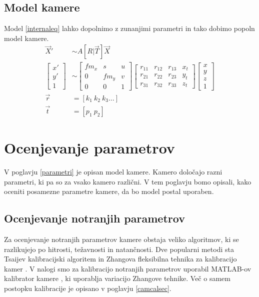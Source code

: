 \documentclass[a4paper, 12pt]{book}
\begin{document}
\subsection{Model kamere}

Model \eqref{internaleq} lahko dopolnimo z zunanjimi parametri in tako dobimo popoln model kamere.
\begin{align}
\label{totalmodel}
\vec{X}' &\sim A[R | \vec{T}] \vec{X} \\
\begin{bmatrix}
x' \\
y' \\
1
\end{bmatrix}
&\sim
\begin{bmatrix}
fm_x & s & u \\
0 & fm_y & v \\
0 & 0 & 1
\end{bmatrix}
\begin{bmatrix}
r_{11} & r_{12} & r_{13} & x_t\\
r_{21} & r_{22} & r_{23} & y_t\\
r_{31} & r_{32} & r_{33} & z_t
\end{bmatrix}
\begin{bmatrix}
x \\
y \\
z \\
1
\end{bmatrix} \\
\vec{r} &= [k_1 \ k_2 \ k_3 \dots] \\
\vec{t} &= [p_1 \ p_2]
\end{align}

\section{Ocenjevanje parametrov}
V poglavju \ref{parametri} je opisan model kamere. Kamero določajo razni parametri, ki pa so za vsako kamero različni. V tem poglavju bomo opisali, kako oceniti posamezne parametre kamere, da bo model postal uporaben.

\subsection{Ocenjevanje notranjih parametrov}
Za ocenjevanje notranjih parametrov kamere obstaja veliko algoritmov, ki se razlikujejo po hitrosti, težavnosti in natančnosti. Dve popularni metodi sta Tsaijev kalibracijski algoritem \cite{horn2000tsai} in Zhangova fleksibilna tehnika za kalibracijo kamer \cite{zhang2000flexible}. V nalogi smo za kalibracijo notranjih parametrov uporabil MATLAB-ov kalibrator kamere \cite{matlabcalib}, ki uporablja variacijo Zhangove tehnike. Več o samem postopku kalibracije je opisano v poglavju \ref{camcalsec}. 
\end{document}
